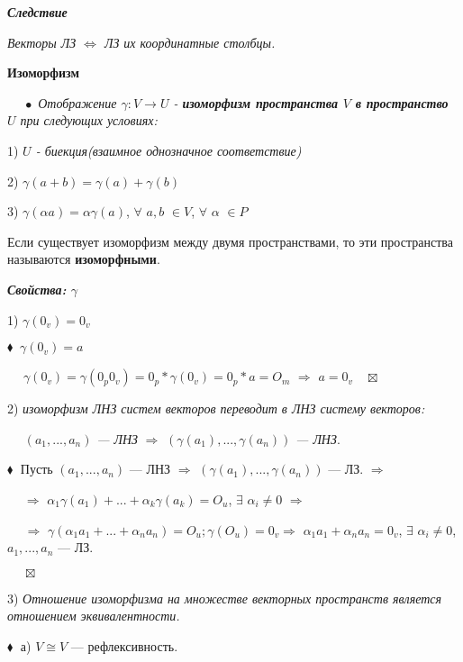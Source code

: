 \documentclass[a4paper, 12pt]{report}
\begin{document}
	\par\bigskip
	\textit{\textbf{Следствие}}
	
	\textit{Векторы ЛЗ $\Leftrightarrow$ ЛЗ их координатные столбцы.}
	\par\bigskip
	\textbf{Изоморфизм}
	\par\bigskip
	$\quad\; \bullet$ \textit{Отображение $\gamma: V \rightarrow U$ - \textbf{изоморфизм пространства $V$ в пространство $U$} при следующих условиях:}
	
	1) \textit{$U$ - биекция(взаимное однозначное соответствие)}
	
	2) $\gamma(a+b) = \gamma(a) + \gamma(b)$
	
	3) $\gamma(\alpha a) = \alpha \gamma(a)$, $\forall$ $a, b$ $\in V$, $\forall$ $\alpha$ $\in P$
	\par\bigskip
	Если существует изоморфизм между двумя пространствами, то эти пространства называются \textbf{изоморфными}.
	
	\par\bigskip
	\textbf{\textit{Свойства:} $\gamma$}
	
	1) $\gamma(0_v) = 0_v$
	\par\bigskip
	$\blacklozenge\;\; \gamma(0_v) = a$
	
	$\quad\;\gamma(0_v) = \gamma(0_p 0_v) = 0_p * \gamma(0_v) = 0_p * a = O_m$ $\Rightarrow$ $a = 0_v\quad\boxtimes$
	
	\par\bigskip
	
	2) \textit{изоморфизм ЛНЗ систем векторов переводит в ЛНЗ систему векторов:}
	
	$\quad$ $(a_1, ..., a_n)$\textit{ --- ЛНЗ} $\Rightarrow$ $(\gamma(a_1), ..., \gamma(a_n))$\textit{ --- ЛНЗ}.
	\par\bigskip
	$\blacklozenge\;$ Пусть $(a_1, ..., a_n)$ --- ЛНЗ $\Rightarrow$ $(\gamma(a_1), ..., \gamma(a_n))$ --- ЛЗ. $\Rightarrow$
	
	$\quad\;\Rightarrow$ $\alpha_1\gamma(a_1) + ... + \alpha_k \gamma(a_k) = O_u$, $\exists$ $\alpha_i \neq 0$ $\Rightarrow$
	
	$\quad$ $\Rightarrow$ $\gamma(\alpha_1a_1 + ... + \alpha_n a_n) = O_u; \gamma(O_u) = 0_v \Rightarrow$ $\alpha_1a_1 + \alpha_n a_n = 0_v$, $\exists$ $\alpha_i \neq 0$, $a_1, ..., a_n$ --- ЛЗ.
	
	$\quad\;\boxtimes$
	
	\par\bigskip
	
	3) \textit{Отношение изоморфизма на множестве векторных пространств является отношением эквивалентности.}
	\par\bigskip
	$\blacklozenge\;$ а) $V \cong V$ --- рефлексивность.
	
\end{document}
